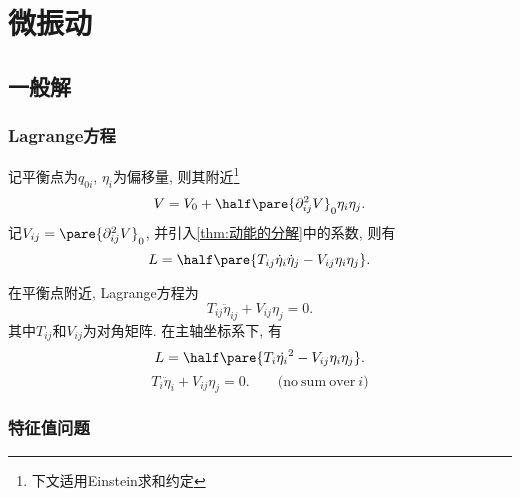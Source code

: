 \documentclass[../TheoreticalMechanics.tex]{subfiles}
\begin{document}
\section{微振动} %
\label{sec:微振动}

\subsection{一般解} %
\label{sub:一般解}

\subsubsection{Lagrange方程} %
\label{ssub:lagrange方程}

\begin{lemma}[平衡点附近的Lagrange量]
    记平衡点为$q_{0i}$, $\eta_i$为偏移量, 则其附近\footnote{下文适用Einstein求和约定}
    \[ V = V_0 + \half \pare{\partial^2_{ij}V}_0\eta_i\eta_j. \]
    记$V_{ij} = \pare{\partial^2_{ij}V}_0$,  并引入\cref{thm:动能的分解}中的系数, 则有
    \[ L = \half\pare{T_{ij}\dot{\eta}_i\dot{\eta}_j - V_{ij}\eta_i\eta_j}. \]
\end{lemma}
\begin{finale}
    \begin{theorem}[Lagrange方程]
        在平衡点附近, Lagrange方程为
        \[ T_{ij}\ddot{\eta}_{ij} + V_{ij}\eta_j = 0. \]
        其中$T_{ij}$和$V_{ij}$为对角矩阵. 在主轴坐标系下, 有
        \[ L = \half \pare{T_i \dot{\eta_i}^2 - V_{ij}\eta_i\eta_j}. \]
        \begin{equation}
            \label{eq:主轴下微振动方程}
            T_i\ddot{\eta}_i + V_{ij}\eta_j = 0.\qquad \mathrm{(no\ sum\ over\ }i \mathrm{)} 
        \end{equation}
    \end{theorem}
\end{finale}


\subsubsection{特征值问题} %
\label{ssub:特征值问题}
\end{document}
